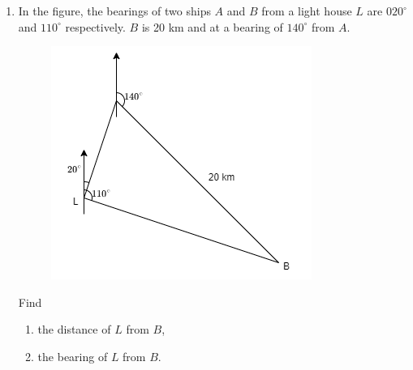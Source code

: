 \documentclass[11pt]{article}
\begin{document}
\begin{enumerate}
        \hrulefill
        
        \hrulefill
        
        \hrulefill
        
        \hrulefill
        
        \hrulefill
        
        \hrulefill
        
        \hrulefill

    \pagebreak
    \item In the figure, the bearings of two ships $A$ and $B$ from a light house $L$ are $020^\circ$ and $110^\circ$ respectively. $B$ is 20 km and at a bearing of $140^\circ$ from $A$.\begin{figure}[H]
        \centering
        \includegraphics[scale=0.6]{f4finalq37.png}
    \end{figure} Find \begin{enumerate}
        \item the distance of $L$ from $B$,
        \item the bearing of $L$ from $B$.
    \end{enumerate}

    \hrulefill

        \hrulefill
            
        \hrulefill
        
        \hrulefill
        
        \hrulefill
        
        \hrulefill
        
        \hrulefill
        
        \hrulefill
        
        \hrulefill
        
        \hrulefill
        

\end{enumerate}
\end{document}
